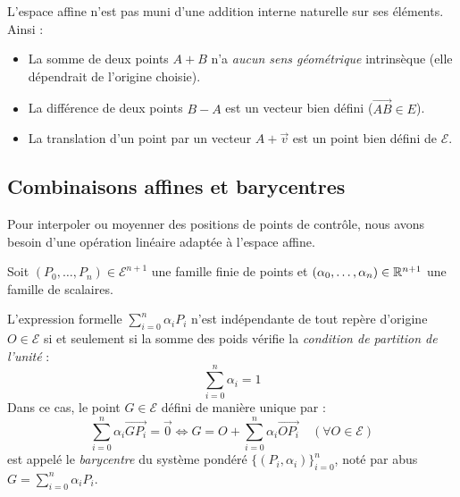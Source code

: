 \begin{remark}
    L'espace affine n'est pas muni d'une addition interne naturelle sur ses éléments. Ainsi :
    \begin{itemize}
        \item La somme de deux points $A + B$ n'a \emph{aucun sens géométrique} intrinsèque (elle dépendrait de l'origine choisie).
        \item La différence de deux points $B - A$ est un vecteur bien défini ($\vec{AB} \in E$).
        \item La translation d'un point par un vecteur $A + \vec{v}$ est un point bien défini de $\mathcal{E}$.
    \end{itemize}
\end{remark}

\subsection{Combinaisons affines et barycentres}

Pour interpoler ou moyenner des positions de points de contrôle, nous avons besoin d'une opération linéaire adaptée à l'espace affine.

\begin{definition}
    Soit $(P_0, \dots, P_n) \in \mathcal{E}^{n+1}$ une famille finie de points et $(\alpha_0, \dots, \alpha_n) \in \mathbb{R}^{n+1}$ une famille de scalaires.
    
    L'expression formelle $\sum_{i=0}^n \alpha_i P_i$ n'est indépendante de tout repère d'origine $O \in \mathcal{E}$ si et seulement si la somme des poids vérifie la \emph{condition de partition de l'unité} :
    \begin{equation}
        \sum_{i=0}^n \alpha_i = 1
    \end{equation}
    Dans ce cas, le point $G \in \mathcal{E}$ défini de manière unique par :
    \begin{equation}
        \sum_{i=0}^n \alpha_i \vec{GP_i} = \vec{0} \iff G = O + \sum_{i=0}^n \alpha_i \vec{OP_i} \quad (\forall O \in \mathcal{E})
    \end{equation}
    est appelé le \emph{barycentre} du système pondéré $\{(P_i, \alpha_i)\}_{i=0}^n$, noté par abus $G = \sum_{i=0}^n \alpha_i P_i$.
\end{definition}

